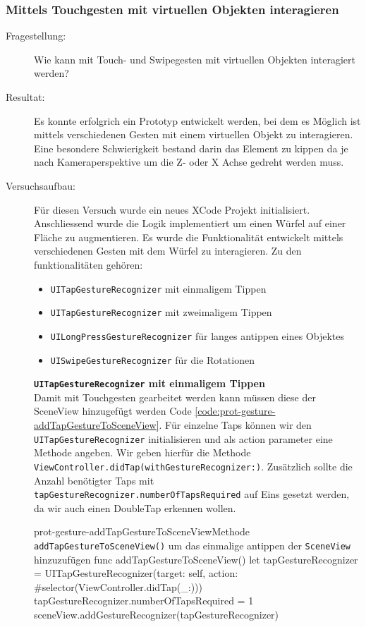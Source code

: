 \subsubsection{Mittels Touchgesten mit virtuellen Objekten interagieren}
\begin{description}
	\item[Fragestellung:] Wie kann mit Touch- und Swipegesten mit virtuellen Objekten interagiert werden?
	\item[Resultat:] Es konnte erfolgrich ein Prototyp entwickelt werden, bei dem es Möglich ist mittels verschiedenen Gesten mit einem virtuellen Objekt zu interagieren. Eine besondere Schwierigkeit bestand darin das Element zu kippen da je nach Kameraperspektive um die Z- oder X Achse gedreht werden muss. 
    \item[Versuchsaufbau:] Für diesen Versuch wurde ein neues XCode Projekt initialisiert. Anschliessend wurde die Logik implementiert um einen Würfel auf einer Fläche zu augmentieren. Es wurde die Funktionalität entwickelt mittels verschiedenen Gesten mit dem Würfel zu interagieren. Zu den funktionalitäten gehören:
    
    
    \begin{itemize}
        \item \texttt{UITapGestureRecognizer} mit einmaligem Tippen
        \item \texttt{UITapGestureRecognizer} mit zweimaligem Tippen
        \item \texttt{UILongPressGestureRecognizer} für langes antippen eines Objektes
        \item \texttt{UISwipeGestureRecognizer} für die Rotationen
    \end{itemize}


    \textbf{\texttt{UITapGestureRecognizer} mit einmaligem Tippen}\\
    Damit mit Touchgesten gearbeitet werden kann müssen diese der SceneView hinzugefügt werden Code \ref{code:prot-gesture-addTapGestureToSceneView}. Für einzelne Taps können wir den \texttt{UITapGestureRecognizer} initialisieren und als action parameter eine Methode angeben. Wir geben hierfür die Methode \texttt{ViewController.didTap(withGestureRecognizer:)}. Zusätzlich sollte die Anzahl benötigter Taps mit \texttt{tapGestureRecognizer.numberOfTapsRequired} auf Eins gesetzt werden, da wir auch einen DoubleTap erkennen wollen. 
    \begin{code}{prot-gesture-addTapGestureToSceneView}{Methode \texttt{addTapGestureToSceneView()} um das einmalige antippen der \texttt{SceneView} hinzuzufügen}
    func addTapGestureToSceneView() {
        let tapGestureRecognizer = UITapGestureRecognizer(target: self, action: #selector(ViewController.didTap(\_:)))
        tapGestureRecognizer.numberOfTapsRequired = 1
        sceneView.addGestureRecognizer(tapGestureRecognizer)
    }
    \end{code}


\end{description}
